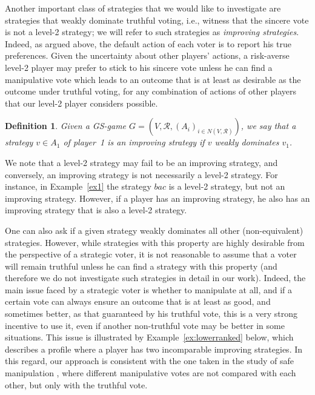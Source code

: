 \documentclass[11pt]{article}
\newtheorem{definition}{Definition}
\newcommand{\calR}{\mathcal{R}}
\begin{document}
Another important class of strategies that we would like to investigate 
are strategies that weakly dominate truthful voting, i.e., witness
that the sincere vote is not a level-2 strategy; we will refer to such strategies 
as {\em improving strategies}.
Indeed, as argued above, the default action of each voter 
is to report his true preferences. Given the uncertainty about other players'
actions, a risk-averse level-2 player may prefer to stick to his sincere vote
unless he can find a manipulative vote which leads to an outcome that is at least as desirable
as the outcome under truthful voting, for any combination of actions of other players
that our level-2 player considers possible. 

\begin{definition}
Given a GS-game $G=(V, \calR, (A_i)_{i\in N(V, \calR)})$, we say that a strategy $v\in A_1$ of player~1
is an {\em improving strategy} if $v$ weakly dominates $v_1$.
\end{definition}

We note that a level-2 strategy may fail to be an improving strategy, 
and conversely, an improving strategy is not necessarily a level-2 strategy.
For instance, in Example~\ref{ex1} the strategy $bac$
is a level-2 strategy, but not an improving strategy.
However, if a player has an improving strategy, he also has an improving strategy
that is also a level-2 strategy. 

One can also ask if a given strategy weakly dominates all other (non-equivalent) strategies. 
However, while strategies with this property are highly desirable from the perspective
of a strategic voter, it is not reasonable to assume that a voter will remain truthful
unless he can find a strategy with this property (and therefore we do not investigate such strategies 
in detail in our work).
Indeed, the main issue faced
by a strategic voter is whether to manipulate at all, and if a certain vote
can always ensure an outcome that is at least as good, and sometimes better, as that guaranteed by his truthful vote, 
this is a very strong incentive to use it, even if another non-truthful vote may be better
in some situations. 
This issue is illustrated by Example~\ref{ex:lowerranked} below, which 
describes a profile where a player has two incomparable improving strategies.
In this regard, our approach is consistent
with the one taken in the study of safe manipulation \citep{safe2}, where
different manipulative votes are not compared with each other, but only with the truthful vote.
\end{document}
